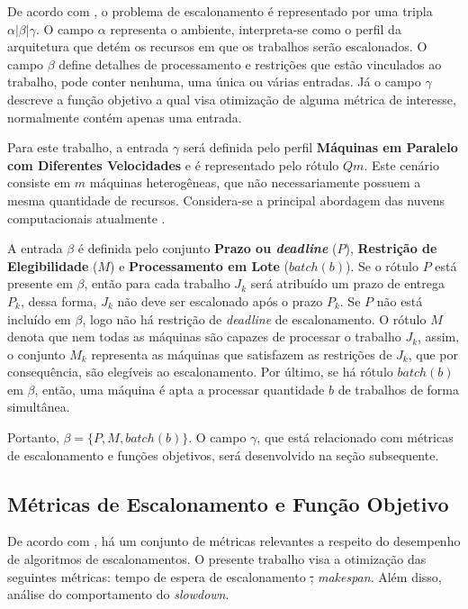 \documentclass[
	12pt,				%
	openright,			%
	oneside,			%
	a4paper,			%
	brazil				%
	]{abntex2}
\providecommand{\DIFaddtex}[1]{{\protect\color{blue}\uwave{#1}}} %
\providecommand{\DIFdeltex}[1]{{\protect\color{red}\sout{#1}}}                      %
\providecommand{\DIFaddbegin}{} %
\providecommand{\DIFaddend}{} %
\providecommand{\DIFdelbegin}{} %
\providecommand{\DIFdelend}{} %
\providecommand{\DIFadd}[1]{\texorpdfstring{\DIFaddtex{#1}}{#1}} %
\providecommand{\DIFdel}[1]{\texorpdfstring{\DIFdeltex{#1}}{}} %
\newcommand{\DIFscaledelfig}{0.5}
\newlength{\DIFdelgraphicswidth} %
\newlength{\DIFdelgraphicsheight} %
\newcommand{\DIFaddincludegraphics}[2][]{{\color{blue}\fbox{\DIFOincludegraphics[#1]{#2}}}} %
\newcommand{\DIFdelincludegraphics}[2][]{%
\sbox{\DIFdelgraphicsbox}{\DIFOincludegraphics[#1]{#2}}%
\settoboxwidth{\DIFdelgraphicswidth}{\DIFdelgraphicsbox} %
\settoboxtotalheight{\DIFdelgraphicsheight}{\DIFdelgraphicsbox} %
\scalebox{\DIFscaledelfig}{%
\parbox[b]{\DIFdelgraphicswidth}{\usebox{\DIFdelgraphicsbox}\\[-\baselineskip] \rule{\DIFdelgraphicswidth}{0em}}\llap{\resizebox{\DIFdelgraphicswidth}{\DIFdelgraphicsheight}{%
\setlength{\unitlength}{\DIFdelgraphicswidth}%
\begin{picture}(1,1)%
\thicklines\linethickness{2pt} %
{\color[rgb]{1,0,0}\put(0,0){\framebox(1,1){}}}%
{\color[rgb]{1,0,0}\put(0,0){\line( 1,1){1}}}%
{\color[rgb]{1,0,0}\put(0,1){\line(1,-1){1}}}%
\end{picture}%
}\hspace*{3pt}}} %
} %
\DeclareRobustCommand{\DIFaddbegin}{\DIFOaddbegin \let\includegraphics\DIFaddincludegraphics} %
\DeclareRobustCommand{\DIFaddend}{\DIFOaddend \let\includegraphics\DIFOincludegraphics} %
\DeclareRobustCommand{\DIFdelbegin}{\DIFOdelbegin \let\includegraphics\DIFdelincludegraphics} %
\DeclareRobustCommand{\DIFdelend}{\DIFOaddend \let\includegraphics\DIFOincludegraphics} %
\begin{document}
De acordo com \cite{pinedo2012scheduling}, o problema de escalonamento é representado por uma tripla $\alpha|\beta|\gamma$. O campo $\alpha$ representa o ambiente, interpreta-se como o perfil da arquitetura que detém os recursos em que os trabalhos serão escalonados. O campo $\beta$ define detalhes de processamento e restrições que estão vinculados ao trabalho, pode conter nenhuma, uma única ou várias entradas. Já o campo $\gamma$ descreve a função objetivo a qual visa otimização de alguma métrica de interesse, normalmente contém apenas uma entrada.

Para este trabalho, a entrada $\gamma$ será definida pelo perfil \textbf{Máquinas em Paralelo com Diferentes Velocidades} e é representado pelo rótulo $Qm$. Este cenário consiste em $m$ máquinas heterogêneas, que não necessariamente possuem a mesma quantidade de recursos. Considera-se a principal abordagem das nuvens computacionais atualmente \cite{krauter2002taxonomy}.

A entrada $\beta$ é definida pelo conjunto \textbf{Prazo ou \textit{deadline}} ($P$), \textbf{Restrição de Elegibilidade} ($M$) e \textbf{Processamento em Lote} ($batch(b)$). Se o rótulo $P$ está presente em $\beta$, então para cada trabalho $J_{k}$ será atribuído um prazo de entrega $P_{k}$, dessa forma, $J_k$ não deve ser escalonado após o prazo $P_{k}$. Se $P$ não está incluído em $\beta$, logo não há restrição de \textit{deadline} de escalonamento. O rótulo $M$ denota que nem todas as máquinas são capazes de processar o trabalho $J_{k}$, assim, o conjunto $M_{k}$ representa as máquinas que satisfazem as restrições de $J_{k}$, que por consequência, são elegíveis ao escalonamento. Por último, se há rótulo $batch(b)$ em $\beta$, então, uma máquina é apta a processar quantidade $b$ de trabalhos de forma simultânea.

Portanto, $\beta=\{P, M, batch(b)\}$. O campo $\gamma$, que está relacionado com métricas de escalonamento e funções objetivos, será desenvolvido na seção subsequente.

\subsection{Métricas de Escalonamento e Função Objetivo}
De acordo com \cite{Feitelson98}, há um conjunto de métricas relevantes a respeito do desempenho de algoritmos de escalonamentos. O presente trabalho visa a otimização das seguintes métricas: tempo de espera de escalonamento \DIFdelbegin \DIFdel{, }\DIFdelend \DIFaddbegin \DIFadd{e }\DIFaddend \textit{makespan}. Além disso, \DIFaddbegin \DIFadd{ocorrerá a }\DIFaddend análise do comportamento do \textit{slowdown}.
\end{document}
